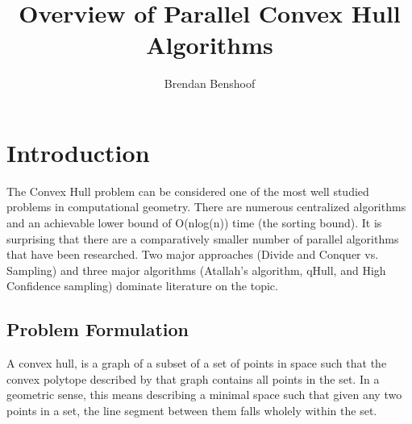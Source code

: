 \documentclass[10pt,a4paper]{report}
\author{Brendan Benshoof}
\title{Overview of Parallel Convex Hull Algorithms}
\begin{document}
\maketitle{}


\section{Introduction}

The Convex Hull problem can be considered one of the most well studied problems in computational geometry. There are numerous centralized algorithms and an achievable lower bound of O(nlog(n)) time (the sorting bound). It is surprising that there are a comparatively smaller number of parallel algorithms that have been researched.
Two major approaches (Divide and Conquer vs. Sampling) and three major algorithms (Atallah's algorithm\cite{Atallah1986Efficient}, qHull, and High Confidence sampling) dominate literature on the topic.
 

\subsection{Problem Formulation}

A convex hull, is a graph of a subset of a set of points in space such that the convex polytope described by that graph contains all points in the set.
In a geometric sense, this means describing a minimal space such that given any two points in a set, the line segment between them falls wholely within the set.
\end{document}
